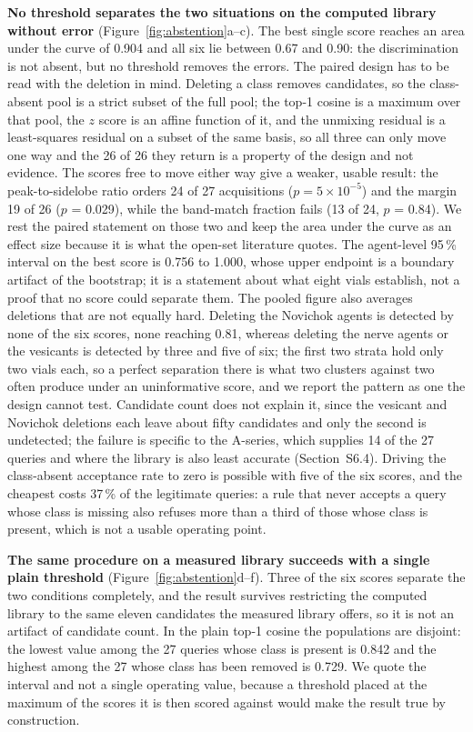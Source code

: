 \documentclass[review,12pt]{elsarticle}
\begin{document}
\textbf{No threshold separates the two situations on the computed library without error}
(Figure~\ref{fig:abstention}a--c). The best single score reaches an area under the curve of
0.904 and all six lie between 0.67 and 0.90: the discrimination is not absent, but no
threshold removes the errors. The paired design has to be read with the deletion in mind.
Deleting a class removes candidates, so the class-absent pool is a strict subset of the
full pool; the top-1 cosine is a maximum over that pool, the $z$ score is an affine function
of it, and the unmixing residual is a least-squares residual on a subset of the same basis,
so all three can only move one way and the 26 of 26 they return is a property of the design
and not evidence. The scores free to move either way give a weaker, usable result: the
peak-to-sidelobe ratio orders 24 of 27 acquisitions ($p = 5\times10^{-5}$) and the margin
19 of 26 ($p$ = 0.029), while the band-match fraction fails (13 of 24, $p$ = 0.84). We rest
the paired statement on those two and keep the area under the curve as an effect size
because it is what the open-set literature quotes. The agent-level 95\,\% interval on the
best score is 0.756 to 1.000, whose upper endpoint is a boundary artifact of the bootstrap;
it is a statement about what eight vials establish, not a proof that no score could
separate them. The pooled figure also averages deletions that are not equally hard.
Deleting the Novichok agents is detected by none of the six scores, none reaching 0.81,
whereas deleting the nerve agents or the vesicants is detected by three and five of six; the
first two strata hold only two vials each, so a perfect separation there is what two
clusters against two often produce under an uninformative score, and we report the pattern
as one the design cannot test. Candidate count does not explain it, since the vesicant and
Novichok deletions each leave about fifty candidates and only the second is undetected;
the failure is specific to the A-series, which supplies 14 of the 27 queries and where the
library is also least accurate (Section~S6.4). Driving the class-absent acceptance rate to
zero is possible with five of the six scores, and the cheapest costs 37\,\% of the
legitimate queries: a rule that never accepts a query whose class is missing also refuses
more than a third of those whose class is present, which is not a usable operating point.

\textbf{The same procedure on a measured library succeeds with a single plain threshold}
(Figure~\ref{fig:abstention}d--f). Three of the six scores separate the two conditions
completely, and the result survives restricting the computed library to the same eleven
candidates the measured library offers, so it is not an artifact of candidate count. In the
plain top-1 cosine the populations are disjoint: the lowest value among the 27 queries whose
class is present is 0.842 and the highest among the 27 whose class has been removed is
0.729. We quote the interval and not a single operating value, because a threshold placed
at the maximum of the scores it is then scored against would make the result true by
construction.
\end{document}
